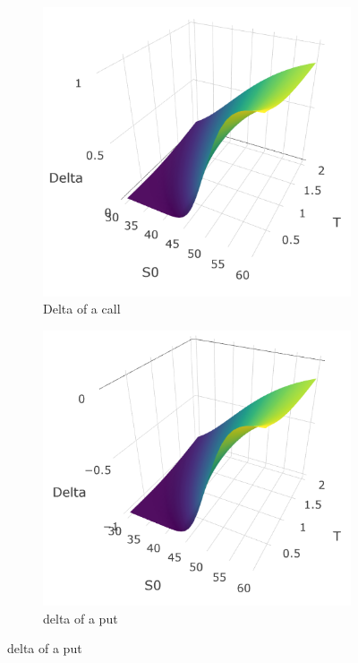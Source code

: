 \documentclass[hidelinks]{article}
\begin{document}
	\begin{figure}[!h]
	\centering
	\caption{Delta surfaces}
  \begin{subfigure}[b]{0.45\textwidth}
    \includegraphics[width=\textwidth]{delta_call.png}
    \caption{Delta of a call}
    \label{fig:delta_call}
  \end{subfigure}
  \begin{subfigure}[b]{0.45\textwidth}
    \includegraphics[width=\textwidth]{delta_put.png}
    \caption{delta of a put}
    \label{fig:delta_put}
  \end{subfigure}
\end{figure}
\end{document}
